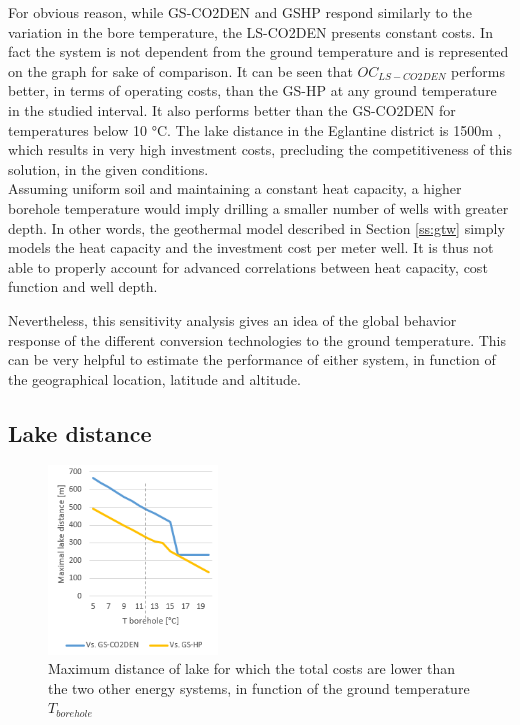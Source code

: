 \documentclass{article}
\begin{document}
For obvious reason, while GS-CO2DEN and GSHP respond similarly to the variation in the bore temperature, the LS-CO2DEN presents constant costs. In fact the system is not dependent from the ground temperature and is represented on the graph for sake of comparison. It can be seen that $OC_{LS-CO2DEN}$ performs better, in terms of operating costs, than the GS-HP at any ground temperature in the studied interval. It also performs better than the GS-CO2DEN for temperatures below 10 \si{\celsius}. The lake distance in the Eglantine district is 1500m , which results in very high investment costs, precluding the competitiveness of this solution, in the given conditions.\\

Assuming uniform soil and maintaining a constant heat capacity, a higher borehole temperature would imply drilling a smaller number of wells with greater depth. In other words, the geothermal model described in Section \ref{ss:gtw} simply models the heat capacity and the investment cost per meter well. It is thus not able to properly account for advanced correlations between heat capacity, cost function and well depth.

Nevertheless, this sensitivity analysis gives an idea of the global behavior response of the different conversion technologies to the ground temperature. This can be very helpful to estimate the performance of either system, in function of the geographical location, latitude and altitude.


\subsection{Lake distance}

\begin{figure} 
	\vspace{-20pt}
	\centering
	\includegraphics[width=0.4\textwidth]{lakeDist.png}
	\caption{Maximum distance of lake for which the total costs are lower than the two other energy systems, in function of the ground temperature $T_{borehole}$}
	\label{fig:lakeDist}
	\vspace{-10pt}
\end{figure}
\end{document}
